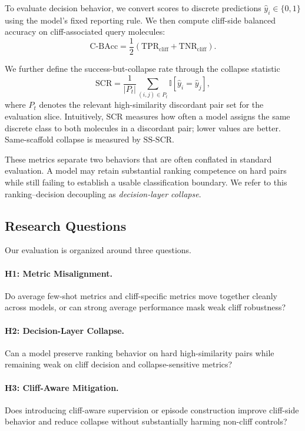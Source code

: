 \documentclass{article}
\begin{document}
To evaluate decision behavior, we convert scores to discrete predictions $\hat{y}_i \in \{0,1\}$ using the model's
fixed reporting rule. We then compute cliff-side balanced accuracy on cliff-associated query molecules:
\[
\mathrm{C\mbox{-}BAcc} = \frac{1}{2}(\mathrm{TPR}_{\mathrm{cliff}} + \mathrm{TNR}_{\mathrm{cliff}}).
\]

We further define the success-but-collapse rate through the collapse statistic
\[
\mathrm{SCR} = \frac{1}{|P_t|} \sum_{(i,j)\in P_t} \mathbb{I}\!\left[\hat{y}_i=\hat{y}_j\right],
\]
where $P_t$ denotes the relevant high-similarity discordant pair set for the evaluation slice. Intuitively,
$\mathrm{SCR}$ measures how often a model assigns the same discrete class to both molecules in a discordant pair;
lower values are better. Same-scaffold collapse is measured by $\mathrm{SS\mbox{-}SCR}$.

These metrics separate two behaviors that are often conflated in standard evaluation. A model may retain
substantial ranking competence on hard pairs while still failing to establish a usable classification boundary. We
refer to this ranking--decision decoupling as \emph{decision-layer collapse}.

\subsection{Research Questions}

Our evaluation is organized around three questions.

\paragraph{H1: Metric Misalignment.}
Do average few-shot metrics and cliff-specific metrics move together cleanly across models, or can strong average
performance mask weak cliff robustness?

\paragraph{H2: Decision-Layer Collapse.}
Can a model preserve ranking behavior on hard high-similarity pairs while remaining weak on cliff decision and
collapse-sensitive metrics?

\paragraph{H3: Cliff-Aware Mitigation.}
Does introducing cliff-aware supervision or episode construction improve cliff-side behavior and reduce collapse
without substantially harming non-cliff controls?
\end{document}
